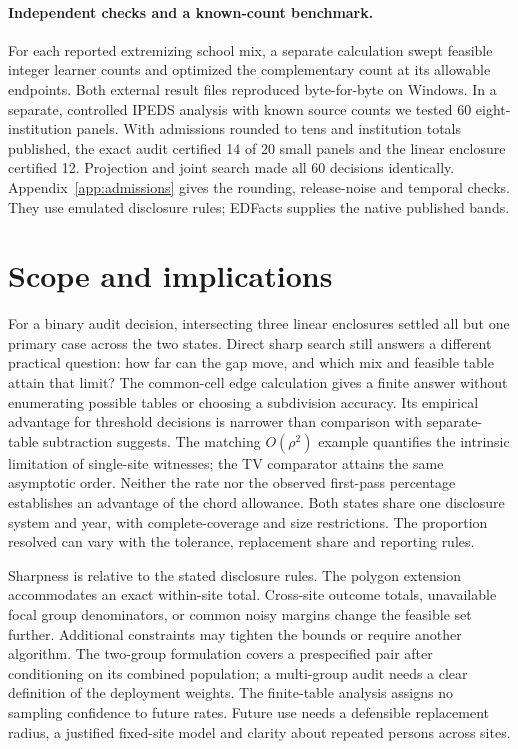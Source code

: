 \documentclass[11pt]{article}
\begin{document}
\paragraph{Independent checks and a known-count benchmark.}
For each reported extremizing school mix, a separate calculation swept feasible integer learner counts and optimized the complementary count at its allowable endpoints. Both external result files reproduced byte-for-byte on Windows. In a separate, controlled IPEDS analysis with known source counts we tested 60 eight-institution panels. With admissions rounded to tens and institution totals published, the exact audit certified 14 of 20 small panels and the linear enclosure certified 12. Projection and joint search made all 60 decisions identically. Appendix~\ref{app:admissions} gives the rounding, release-noise and temporal checks. They use emulated disclosure rules; EDFacts supplies the native published bands.

\section{Scope and implications}
For a binary audit decision, intersecting three linear enclosures settled all but one primary case across the two states. Direct sharp search still answers a different practical question: how far can the gap move, and which mix and feasible table attain that limit? The common-cell edge calculation gives a finite answer without enumerating possible tables or choosing a subdivision accuracy. Its empirical advantage for threshold decisions is narrower than comparison with separate-table subtraction suggests. The matching $O(\rho^2)$ example quantifies the intrinsic limitation of single-site witnesses; the TV comparator attains the same asymptotic order. Neither the rate nor the observed first-pass percentage establishes an advantage of the chord allowance. Both states share one disclosure system and year, with complete-coverage and size restrictions. The proportion resolved can vary with the tolerance, replacement share and reporting rules.

Sharpness is relative to the stated disclosure rules. The polygon extension accommodates an exact within-site total. Cross-site outcome totals, unavailable focal group denominators, or common noisy margins change the feasible set further. Additional constraints may tighten the bounds or require another algorithm. The two-group formulation covers a prespecified pair after conditioning on its combined population; a multi-group audit needs a clear definition of the deployment weights. The finite-table analysis assigns no sampling confidence to future rates. Future use needs a defensible replacement radius, a justified fixed-site model and clarity about repeated persons across sites.
\end{document}
